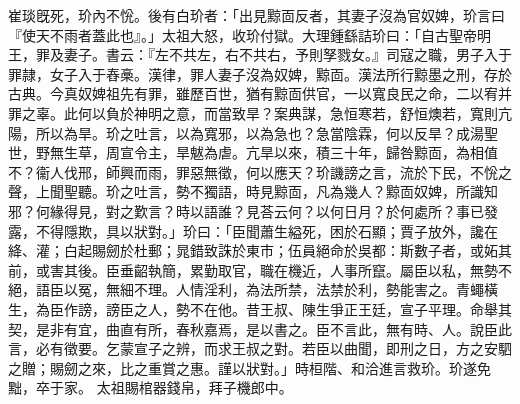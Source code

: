 \begin{pinyinscope}
 
崔琰旣死，玠內不恱。後有白玠者：「出見黥靣反者，其妻子沒為官奴婢，玠言曰『使天不雨者蓋此也』。」太祖大怒，收玠付獄。大理鍾繇詰玠曰：「自古聖帝明王，罪及妻子。書云：『左不共左，右不共右，予則孥戮女。』司寇之職，男子入于罪隷，女子入于舂槀。漢律，罪人妻子沒為奴婢，黥靣。漢法所行黥墨之刑，存於古典。今真奴婢祖先有罪，雖歷百世，猶有黥靣供官，一以寬良民之命，二以宥并罪之辜。此何以負於神明之意，而當致旱？案典謀，急恒寒若，舒恒燠若，寬則亢陽，所以為旱。玠之吐言，以為寬邪，以為急也？急當陰霖，何以反旱？成湯聖世，野無生草，周宣令主，旱魃為虐。亢旱以來，積三十年，歸咎黥靣，為相值不？衞人伐邢，師興而雨，罪惡無徵，何以應天？玠譏謗之言，流於下民，不恱之聲，上聞聖聽。玠之吐言，勢不獨語，時見黥靣，凡為幾人？黥靣奴婢，所識知邪？何緣得見，對之歎言？時以語誰？見荅云何？以何日月？於何處所？事已發露，不得隱欺，具以狀對。」玠曰：「臣聞蕭生縊死，困於石顯；賈子放外，讒在絳、灌；白起賜劒於杜郵；晁錯致誅於東市；伍員絕命於吳都：斯數子者，或妬其前，或害其後。臣垂齠執簡，累勤取官，職在機近，人事所竄。屬臣以私，無勢不絕，語臣以冤，無細不理。人情淫利，為法所禁，法禁於利，勢能害之。青蠅橫生，為臣作謗，謗臣之人，勢不在他。昔王叔、陳生爭正王廷，宣子平理。命舉其契，是非有宜，曲直有所，春秋嘉焉，是以書之。臣不言此，無有時、人。說臣此言，必有徵要。乞蒙宣子之辨，而求王叔之對。若臣以曲聞，即刑之日，方之安駟之贈；賜劒之來，比之重賞之惠。謹以狀對。」時桓階、和洽進言救玠。玠遂免黜，卒于家。
 太祖賜棺器錢帛，拜子機郎中。
 
 
\end{pinyinscope}